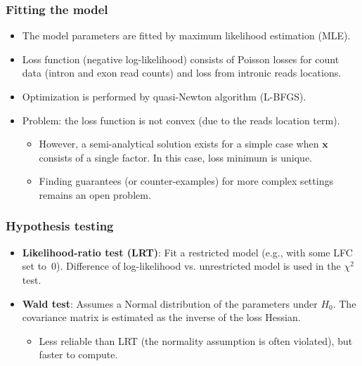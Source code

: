 \documentclass{beamer}
\begin{document}
\begin{frame}
	\frametitle{Fitting the model}
	\pause
	\begin{itemize}
		\item The model parameters are fitted by maximum likelihood estimation (MLE).
		\pause
		\item Loss function (negative log-likelihood) consists of Poisson losses for count data (intron and exon read counts) and loss from intronic reads locations.
		\pause
		\item Optimization is performed by quasi-Newton algorithm (L-BFGS).
		\pause
		\item Problem: the loss function is not convex (due to the reads location term).
		\pause
		\begin{itemize}
			\item However, a semi-analytical solution exists for a simple case when $\mathbf{x}$ consists of a single factor. In this case, loss minimum is unique.
			\item Finding guarantees (or counter-examples) for more complex settings remains an open problem. 
		\end{itemize}
		\end{itemize}
	\end{frame}

\begin{frame}
	\frametitle{Hypothesis testing}
	\pause
	\begin{itemize}
		\item \textbf{Likelihood-ratio test (LRT)}: Fit a restricted model (e.g., with some LFC set to~0). Difference of log-likelihood vs. unrestricted model is used in the $\chi^2$ test.
		\pause
		
		\item \textbf{Wald test}: Assumes a Normal distribution of the parameters under $H_0$. The covariance matrix is estimated as the inverse of the loss Hessian.
		\begin{itemize}
			\item Less reliable than LRT (the normality assumption is often violated), but faster to compute.
		\end{itemize}
		
	\end{itemize}
\end{frame}
	
\end{document}
